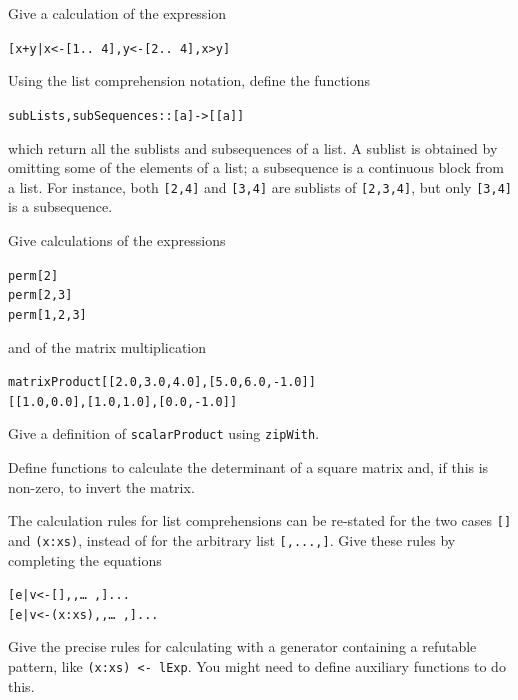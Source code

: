 \begin{exercises}

\item
Give a calculation of the expression
\begin{alltt}
[ x+y | x <- [1 ..\ 4] , y <- [2 ..\ 4] , x>y ]
\end{alltt}

\item
Using the list comprehension notation, define the functions 
\begin{alltt}
subLists,subSequences :: [a] -> [[a]]
\end{alltt}
which return all the
sublists and subsequences of a list. A sublist is obtained by omitting some
of the elements of a list; a subsequence is a
continuous block from a list. For instance, both \texttt{[2,4]} and \texttt{[3,4]}
are sublists of \texttt{[2,3,4]}, but only \texttt{[3,4]} is a subsequence.

\item
Give calculations of the expressions
\begin{alltt}
perm [2]
perm [2,3]
perm [1,2,3]
\end{alltt}
and of the matrix multiplication
\begin{alltt}
matrixProduct [[2.0,3.0,4.0],[5.0,6.0,-1.0]] 
              [[1.0,0.0],[1.0,1.0],[0.0,-1.0]]
\end{alltt}

\item
Give a definition of \texttt{scalarProduct} using \texttt{zipWith}.

\item
Define functions to calculate
the determinant of a square matrix and, if this is
non-zero, to invert the matrix.

\item
The calculation rules for list comprehensions can be re-stated for the two
cases \texttt{[]} and \texttt{(x:xs)}, instead of for the arbitrary list 
\texttt{[,...,]}.
Give these rules by completing the equations
\begin{alltt}
[ e | v <- []     ,  , \ldots\ ,  ] \step ...
[ e | v <- (x:xs) ,  , \ldots\ ,  ] \step ...
\end{alltt}

\item
Give the precise rules for calculating with a generator containing a refutable 
pattern,
like \texttt{(x:xs) <- lExp}. You might need to define auxiliary functions to do
this.


\end{exercises}
